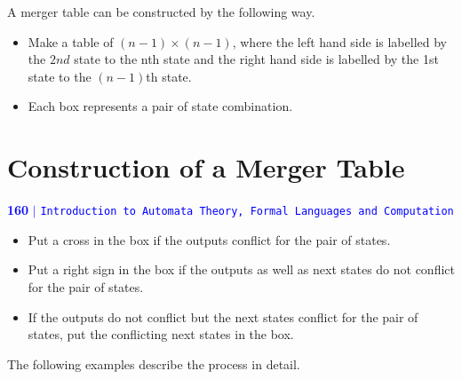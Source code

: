 \documentclass[9pt]{beamer}
\begin{document}
\begin{frame}

\vspace*{0.2cm}
A merger table can be constructed by the following way.\\

\begin{itemize}
  \item Make a table of $(n-1) \times (n-1)$, where the left hand side is labelled by the $2nd$ state to the nth state
and the right hand side is labelled by the 1st state to the $(n-1)$th state.
  \item Each box represents a pair of state combination.
\end{itemize}


\end{frame}
\section*{Construction of a Merger Table}
\begin{frame}
\begin{flushleft}
 \textcolor{blue}{\textbf{160}\hspace*{0.1cm} \textbf{$|$} \hspace*{0.1cm} \texttt{Introduction to Automata Theory, Formal Languages and Computation}}
  \end{flushleft}


\vspace*{1cm}
\begin{itemize}
  \item Put a cross in the box if the outputs conflict for the pair of states.\\
  \item Put a right sign in the box if the outputs as well as next states do not conflict for the pair of states.\\
  \item If the outputs do not conflict but the next states conflict for the pair of states, put the conflicting
next states in the box.\\
\end{itemize}

The following examples describe the process in detail.\\

\vspace*{0.5cm}
\end{frame}
\end{document}
